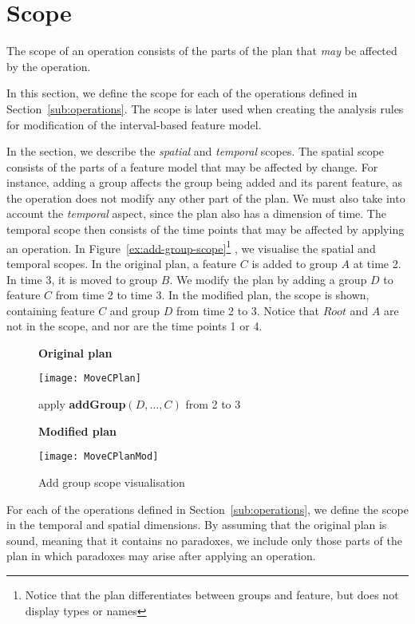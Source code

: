 
\section{Scope}
\label{sec:scope}

The scope of an operation consists of the parts of the plan that \emph{may} be affected by the operation.

In this section, we define the scope for each of the operations defined in Section~\vref{sub:operations}. The scope is later used when creating the analysis rules for modification of the interval-based feature model.

In the section, we describe the \emph{spatial} and \emph{temporal} scopes. The spatial scope consists of the parts of a feature model that may be affected by change. For instance, adding a group affects the group being added and its parent feature, as the operation does not modify any other part of the plan. We must also take into account the \emph{temporal} aspect, since the plan also has a dimension of time. The temporal scope then consists of the time points that may be affected by applying an operation. In Figure~\vref{ex:add-group-scope}\footnote{Notice that the plan differentiates between groups and feature, but does not display types or names} %
, we visualise the spatial and temporal scopes. In the original plan, a feature $C$ is added to group $A$ at time 2. In time 3, it is moved to group $B$. We modify the plan by adding a group $D$ to feature $C$ from time 2 to time 3. In the modified plan, the scope is shown, containing feature $C$ and group $D$ from time 2 to 3. Notice that $Root$ and $A$ are not in the scope, and nor are the time points 1 or 4.
\begin{figure}[h]
  \centering
      \textbf{Original plan}

      \texttt{[image: MoveCPlan]}
      \bigskip
      
      apply \textbf{addGroup}$(D, \ldots, C)$ from 2 to 3  
      \bigskip

      \textbf{Modified plan}

      \texttt{[image: MoveCPlanMod]}
  \caption{Add group scope visualisation}
  \label{ex:add-group-scope}
\end{figure}

For each of the operations defined in Section~\vref{sub:operations}, we define the scope in the temporal and spatial dimensions. By assuming that the original plan is sound, meaning that it contains no paradoxes, we include only those parts of the plan in which paradoxes may arise after applying an operation.

